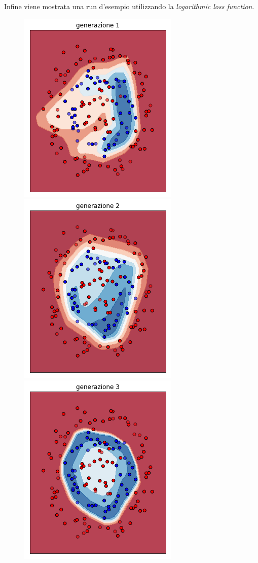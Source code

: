 \documentclass[12pt,a4paper]{report}
\begin{document}
Infine viene mostrata una run d'esempio utilizzando la \textit{logarithmic loss function}.

\begin{figure}[H]
 \centering
 \includegraphics[scale = 0.37]{images/circle+-rnd-log./1}
 \includegraphics[scale = 0.37]{images/circle+-rnd-log./2}
 \includegraphics[scale = 0.37]{images/circle+-rnd-log./3}

\end{figure}
\end{document}
